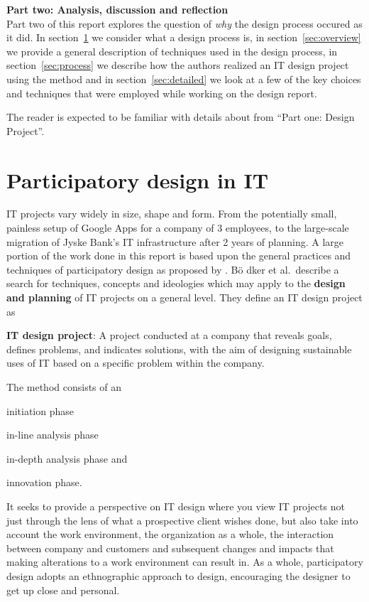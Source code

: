 \setcounter{section}{0}
\setcounter{figure}{0}
\setcounter{table}{0}
\newpage
\textbf{\LARGE{{Part two: Analysis, discussion and reflection}}}\\

Part two of this report explores the question of \textit{why}
the design process occured as it did. In section~\ref{sec:participatory}
we consider what a design process is, in section~\ref{sec:overview}
we provide a general description of techniques used in the design process,
in section~\ref{sec:process} we describe how the authors realized an IT design
project using the \must{} method and in section~\ref{sec:detailed} we
look at a few of the key choices and techniques that were employed while working
on the design report.

The reader is expected to be familiar with details about \gomonkey{} 
from ``Part one: Design Project''.

\section{Participatory design in IT} \label{sec:participatory}
IT projects vary widely in size, shape and form. From the potentially small, painless 
setup of Google Apps for a company of 3 employees, to the large-scale migration of
Jyske Bank's IT infrastructure after 2 years of planning\cite{jyskebank}.
A large portion of the work done in this report is based upon the general
practices and techniques of participatory design as proposed by \cite{bodker2004participatory}.
B\"o dker et al.\ describe a search for techniques, concepts and ideologies which may apply
to the \textbf{design and planning} of IT projects on a general level. They
define an IT design project as
\vspace{5mm}
\begin{framed}
\textbf{IT design project}: A project conducted at a company that reveals
goals, defines problems, and indicates solutions, with the aim of designing
sustainable uses of IT based on a specific problem within the company.
\end{framed}
\vspace{5mm}
The \must{}\cite{bodker2004participatory} method consists of an
\begin{inparaenum}[1)]
\item initiation phase
\item in-line analysis phase
\item in-depth analysis phase and
\item innovation phase.
\end{inparaenum}
It seeks to provide a perspective on IT design where you view IT projects not
just through the lens of what a prospective client wishes done, but also take into
account the work environment, the organization as a whole, the interaction
between company and customers and subsequent changes and impacts that making
alterations to a work environment can result in. As a whole, participatory
design adopts an ethnographic approach to design, encouraging the designer to
get up close and personal.

